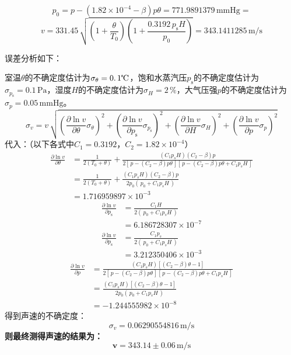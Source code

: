 \documentclass[a4paper,fontset=windows]{ctexart}
\begin{document}
    \[
    p_0 = p-(1.82\times10^{-4}-\beta)p\theta = 771.9891379\,\mathrm{mmHg} =
    \]
    \[
    v = 331.45\,\sqrt{\left(1+\frac{\theta}{T_0}\right)\left(1+\frac{0.3192\, p_{\mathrm{s}}H}{p_0}\right)} = 343.1411285\,\mathrm{m/s}
    \]

    误差分析如下：

    室温$\theta$的不确定度估计为$\sigma_{\theta}=0.\,1\text{\textcelsius}$，饱和水蒸汽压$p_{\mathrm{s}}$的不确定度估计为$\sigma_{p_\mathrm{s}}=0.1\,\mathrm{Pa}$，湿度$H$的不确定度估计为$\sigma_{H}=2\,\%$，大气压强$p$的不确定度估计为$\sigma_{p}=0.05\,\mathrm{mmHg}$。
    \[
    \sigma_v = v \,\sqrt{\left(\frac{\partial\ln{v}}{\partial\theta}\sigma_{\theta}\right)^2 + \left(\frac{\partial\ln{v}}{\partial p_\mathrm{s}}\sigma_{p_\mathrm{s}}\right)^2 + \left(\frac{\partial\ln{v}}{\partial H}\sigma_{H}\right)^2 + \left(\frac{\partial\ln{v}}{\partial p}\sigma_{p}\right)^2}
    \]
    代入：（以下各式中$C_1 = 0.3192$，$C_2 = 1.82\times10^{-4}$）
    \begin{align*}
    \frac{\partial\ln{v}}{\partial\theta}
    &= \frac{1}{2(T_0+\theta)} + \frac{(C_1 p_s H)(C_2-\beta)p}{2\left[\,p-(C_2-\beta)p\theta\,\right]\left[\,p-(C_2-\beta)p\theta+C_1 p_s H \,\right]} \\
    &= \frac{1}{2(T_0+\theta)} + \frac{(C_1 p_s H)(C_2-\beta)p}{2p_0(\, p_0+C_1 p_s H \,)} \\
    &= 1.716959897\times10^{-3}
    \end{align*}
    \begin{align*}
    \frac{\partial\ln{v}}{\partial p_{\mathrm{s}}}
    &= \frac{C_1 H}{2(\, p_0+C_1 p_s H \,)} \\
    &= 6.186728307\times10^{-7}
    \end{align*}
    \begin{align*}
    \frac{\partial\ln{v}}{\partial p_{\mathrm{s}}}
    &= \frac{C_1 p_s}{2(\, p_0+C_1 p_s H \,)} \\
    &= 3.212350406\times10^{-3}
    \end{align*}
    \begin{align*}
    \frac{\partial\ln{v}}{\partial p}
    &= \frac{(C_1 p_s H)\left[(C_2-\beta)\theta-1\right]}{2\left[\,p-(C_2-\beta)p\theta\,\right]\left[\,p-(C_2-\beta)p\theta+C_1 p_s H \,\right]} \\
    &= \frac{(C_1 p_s H)\left[(C_2-\beta)\theta-1\right]}{2p_0(\, p_0+C_1 p_s H \,)} \\
    &= -1.244555982\times10^{-8}
    \end{align*}
    得到声速的不确定度：
    \[
    \sigma_v = 0.06290554816\,\mathrm{m/s}
    \]
    \textbf{则最终测得声速的结果为：}
    \[
    \boldsymbol{v = 343.14\pm0.06\,\mathrm{m/s}}
    \]
\end{document}
